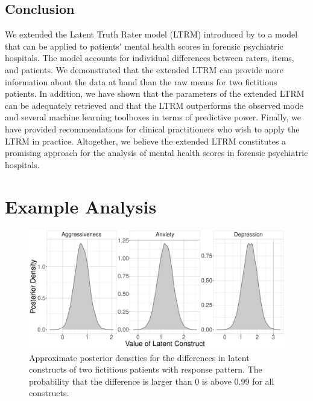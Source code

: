 \documentclass[a4paper,usenames,dvipsnames]{article}
\newenvironment{revision}{\color{black}}{\color{black}}
\begin{document}
\subsection*{Conclusion}
We extended the Latent Truth Rater model (LTRM) introduced by  to a model that can be applied to patients' mental health scores in forensic psychiatric hospitals. The model accounts for individual differences between raters, items, and patients. We demonstrated that the extended LTRM can provide more information about the data at hand than the raw means for two fictitious patients. In addition, we have shown that the parameters of the extended LTRM can be adequately retrieved and that the LTRM outperforms the observed mode and several machine learning toolboxes in terms of predictive power. Finally, we have provided recommendations for clinical practitioners who wish to apply the LTRM in practice. \protect\begin{revision}Altogether, we believe the extended LTRM constitutes a promising approach for the analysis of mental health scores in forensic psychiatric hospitals.\protect\end{revision}





\newpage
\appendix
{}

\section{Example Analysis}

\begin{figure}[!ht]
	\includegraphics[width=\textwidth]{figures/twoPatientsDiffDensity.pdf}
	\caption{Approximate posterior densities for the differences in latent constructs of two fictitious patients with response pattern. The probability that the difference is larger than 0 is above $0.99$ for all constructs.}
	\label{fig:ExamplePosteriorDiff}
\end{figure}
\end{document}
